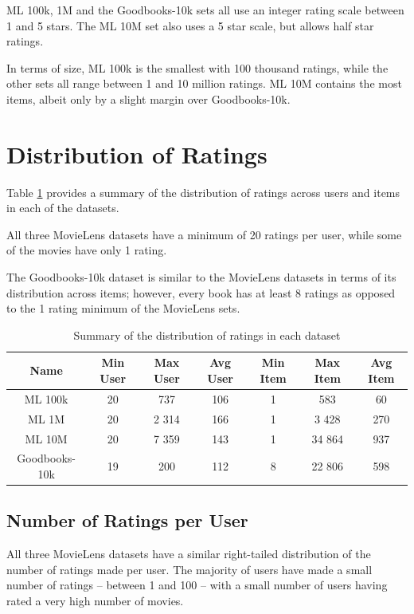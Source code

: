 ML 100k, 1M and the Goodbooks-10k sets all use an integer rating scale between 1 and 5 stars. The ML 10M set also uses a 5 star scale, but allows half star ratings.

In terms of size, ML 100k is the smallest with 100 thousand ratings, while the other sets all range between 1 and 10 million ratings. ML 10M contains the most items, albeit only by a slight margin over Goodbooks-10k.

\section{Distribution of Ratings}
Table \ref{tab:ratings-distribution} provides a summary of the distribution of ratings across users and items in each of the datasets.

All three MovieLens datasets have a minimum of 20 ratings per user, while some of the movies have only 1 rating.

The Goodbooks-10k dataset is similar to the MovieLens datasets in terms of its distribution across items; however, every book has at least 8 ratings as opposed to the 1 rating minimum of the MovieLens sets.

\begin{table}[H]
\centering
\begin{tabular}{c | c | c | c | c | c | c}
\toprule
\textbf{Name} & \textbf{Min User} & \textbf{Max User} & \textbf{Avg User} & \textbf{Min Item} & \textbf{Max Item} & \textbf{Avg Item} \\
\midrule
ML 100k & 20 & 737 & 106 & 1 & 583 & 60 \\
ML 1M & 20 & 2 314 & 166 & 1 & 3 428 & 270 \\
ML 10M & 20 & 7 359 & 143 & 1 & 34 864 & 937 \\
Goodbooks-10k & 19 & 200 & 112 & 8 & 22 806 & 598 \\
\bottomrule
\end{tabular}
\caption[Ratings distribution]{Summary of the distribution of ratings in each dataset}
\label{tab:ratings-distribution}
\end{table}

\subsection{Number of Ratings per User}
All three MovieLens datasets have a similar right-tailed distribution of the number of ratings made per user. The majority of users have made a small number of ratings -- between 1 and 100 -- with a small number of users having rated a very high number of movies.


